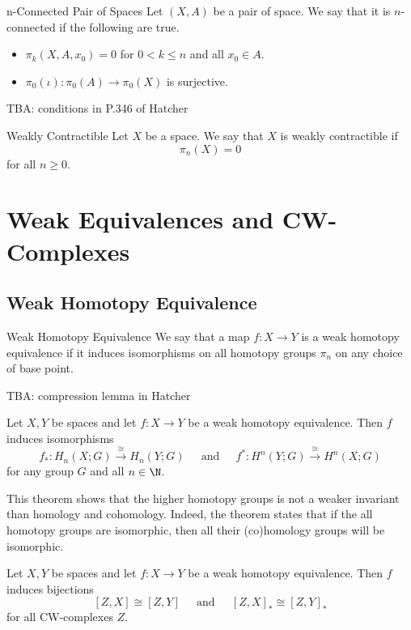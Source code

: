 \documentclass[a4paper]{article}
\begin{document}
\begin{defn}{n-Connected Pair of Spaces}{} Let $(X,A)$ be a pair of space. We say that it is $n$-connected if the following are true. 
\begin{itemize}
\item $\pi_k(X,A,x_0)=0$ for $0<k\leq n$ and all $x_0\in A$. 
\item $\pi_0(\iota):\pi_0(A)\to\pi_0(X)$ is surjective. 
\end{itemize}
\end{defn}

TBA: conditions in P.346 of Hatcher

\begin{defn}{Weakly Contractible}{} Let $X$ be a space. We say that $X$ is weakly contractible if $$\pi_n(X)=0$$ for all $n\geq 0$. 
\end{defn}

\pagebreak
\section{Weak Equivalences and CW-Complexes}
\subsection{Weak Homotopy Equivalence}
\begin{defn}{Weak Homotopy Equivalence}{} We say that a map $f:X\to Y$ is a weak homotopy equivalence if it induces isomorphisms on all homotopy groups $\pi_n$ on any choice of base point. 
\end{defn}

TBA: compression lemma in Hatcher

\begin{thm}{}{} Let $X,Y$ be spaces and let $f:X\to Y$ be a weak homotopy equivalence. Then $f$ induces isomorphisms $$f_\ast:H_n(X;G)\overset{\cong}{\longrightarrow}H_n(Y;G)\;\;\;\;\text{ and }\;\;\;\;f^\ast:H^n(Y;G)\overset{\cong}{\longrightarrow}H^n(X;G)$$ for any group $G$ and all $n\in\N$. 
\end{thm}

This theorem shows that the higher homotopy groups is not a weaker invariant than homology and cohomology. Indeed, the theorem states that if the all homotopy groups are isomorphic, then all their (co)homology groups will be isomorphic. 

\begin{prp}{}{} Let $X,Y$ be spaces and let $f:X\to Y$ be a weak homotopy equivalence. Then $f$ induces bijections $$[Z,X]\cong[Z,Y]\;\;\;\;\text{ and }\;\;\;\;[Z,X]_\ast\cong[Z,Y]_\ast$$ for all CW-complexes $Z$. 
\end{prp}
\end{document}
